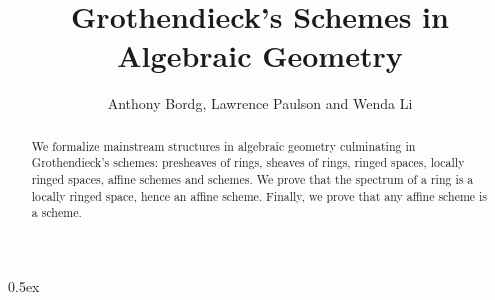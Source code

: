 \documentclass[11pt,a4paper]{article}
\begin{document}
\title{Grothendieck's Schemes in Algebraic Geometry}
\author{Anthony Bordg, Lawrence Paulson and Wenda Li}
\maketitle

\begin{abstract}
  We formalize mainstream structures in algebraic geometry \cite{hartshorne2013algebraic,lang2005algebra} culminating in Grothendieck's schemes: presheaves of rings, sheaves of rings, ringed spaces, locally ringed spaces, affine schemes and schemes. We prove that the spectrum of a ring is a locally ringed space, hence an affine scheme. Finally, we prove that any affine scheme is a scheme. 
\end{abstract}

\tableofcontents

\parindent 0pt\parskip 0.5ex




\end{document}
